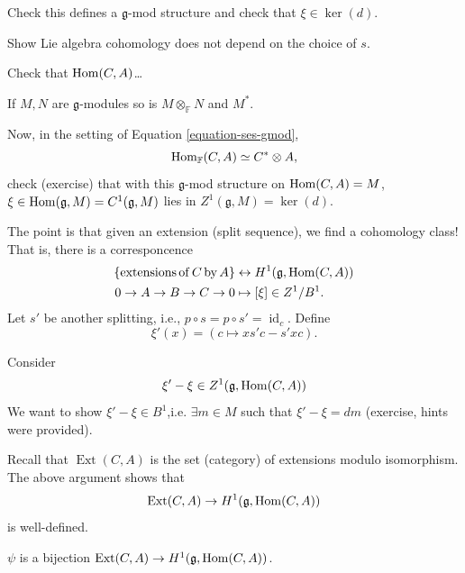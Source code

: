 \begin{exercise}
\label{exercise-g-mod-structure}
Check this defines a $\mathfrak{g}$-mod
structure and check that $\xi \in \ker(d)$.
\end{exercise}

\begin{exercise}
\label{exercise-does-not-depend}
Show Lie algebra cohomology does not
depend on the choice of $s$.
\end{exercise}

\begin{exercise}
\label{exercise-homca}
Check that $\mathop{\mathrm{Hom}}\nolimits(C,A)$…
\end{exercise}

\begin{remark}
\label{remark-tensor-g-modules}
If $M,N$ are $\mathfrak{g}$-modules
so is $M \otimes_{\mathbb{F}} N$
and $M^*$.
\end{remark}

\noindent
Now, in the setting of
Equation \ref{equation-ses-gmod},
$$
\mathop{\mathrm{Hom}}\nolimits_{\mathbb{F}}(C,A)
\simeq
C^* \otimes A,
$$
check (exercise) that with this
$\mathfrak{g}$-mod structure on $\mathop{\mathrm{Hom}}\nolimits(C,A)=M
$, $\xi \in
\mathop{\mathrm{Hom}}\nolimits(\mathfrak{g},M)=C^1(\mathfrak{g},M)$
lies in $Z^1(\mathfrak{g},M)=\ker(d)$.

The point is that given an extension (split
sequence), we find a cohomology class!
That is, there is a corresponcence
$$
\begin{aligned}
\{\operatorname{extensions}
\operatorname{of}C
\operatorname{by} A\}
&\leftrightarrow
H^1(\mathfrak{g},\mathop{\mathrm{Hom}}\nolimits(C,A))\\
0\to A\to B \to C \to 0
&\mapsto [\xi] \in Z^1/B^1.
\end{aligned}
$$
\noindent
Let $s'$ be another splitting, i.e.,
$p \circ s = p \circ s' =
\operatorname{id}_c$.
Define
$$
\xi'(x) = (c \mapsto xs'c-s'xc).
$$

Consider
$$
\xi' - \xi \in
Z^1(\mathfrak{g},\mathop{\mathrm{Hom}}\nolimits(C,A))
$$
We want to show
$\xi'-\xi \in B^1$,i.e. $\exists m \in M$
such that $\xi'-\xi = dm$ (exercise, hints
were provided).

Recall that $\operatorname{Ext}(C,A)$ is
the set (category) of extensions modulo 
isomorphism. The above argument shows that
$$
\operatorname{Ext}(C,A)
\to H^1(\mathfrak{g},\mathop{\mathrm{Hom}}\nolimits(C,A))
$$
is well-defined.

\begin{theorem}
\label{theorem-extensions-cohomology}
$\psi$ is a bijection
$\operatorname{Ext}(C,A) \to
H^1(\mathfrak{g},\mathop{\mathrm{Hom}}\nolimits(C,A))$.
\end{theorem}

